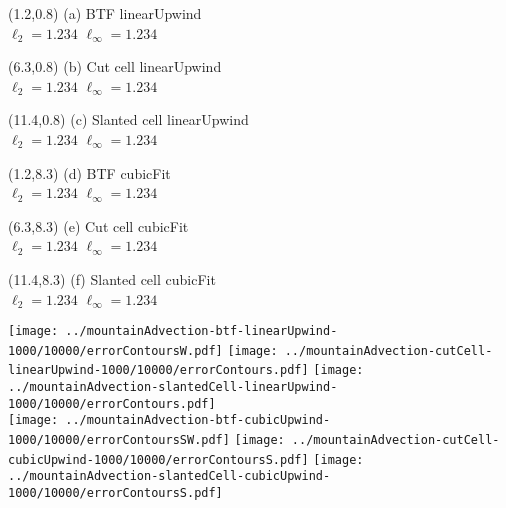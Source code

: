 \documentclass{article}
\begin{document}
\TPMargin{1pt}
\begin{textblock}{4}(1.2,0.8)
\normalsize
(a) BTF linearUpwind \\
\hspace*{1.4em}$\ell_2 = \num{1.234}$
\hspace*{1.4em}$\ell_\infty = \num{1.234}$
\end{textblock}
\begin{textblock}{4}(6.3,0.8)
\normalsize
(b) Cut cell linearUpwind \\
\hspace*{1.4em}$\ell_2 = \num{1.234}$
\hspace*{1.4em}$\ell_\infty = \num{1.234}$
\end{textblock}
\begin{textblock}{4}(11.4,0.8)
\normalsize
(c) Slanted cell linearUpwind \\
\hspace*{1.4em}$\ell_2 = \num{1.234}$
\hspace*{1.4em}$\ell_\infty = \num{1.234}$
\end{textblock}
\begin{textblock}{4}(1.2,8.3)
\normalsize
(d) BTF cubicFit \\
\hspace*{1.4em}$\ell_2 = \num{1.234}$
\hspace*{1.4em}$\ell_\infty = \num{1.234}$
\end{textblock}
\begin{textblock}{4}(6.3,8.3)
\normalsize
(e) Cut cell cubicFit \\
\hspace*{1.4em}$\ell_2 = \num{1.234}$
\hspace*{1.4em}$\ell_\infty = \num{1.234}$
\end{textblock}
\begin{textblock}{4}(11.4,8.3)
\normalsize
(f) Slanted cell cubicFit \\
\hspace*{1.4em}$\ell_2 = \num{1.234}$
\hspace*{1.4em}$\ell_\infty = \num{1.234}$
\end{textblock}
\texttt{[image: ../mountainAdvection-btf-linearUpwind-1000/10000/errorContoursW.pdf]}
\hspace*{0.26em}
\texttt{[image: ../mountainAdvection-cutCell-linearUpwind-1000/10000/errorContours.pdf]}
\hspace*{0.26em}
\texttt{[image: ../mountainAdvection-slantedCell-linearUpwind-1000/10000/errorContours.pdf]} \\
\texttt{[image: ../mountainAdvection-btf-cubicUpwind-1000/10000/errorContoursSW.pdf]}
\texttt{[image: ../mountainAdvection-cutCell-cubicUpwind-1000/10000/errorContoursS.pdf]}
\texttt{[image: ../mountainAdvection-slantedCell-cubicUpwind-1000/10000/errorContoursS.pdf]}
\end{document}
